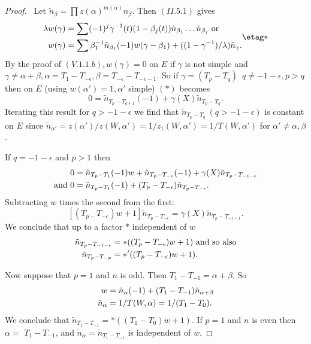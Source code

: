 \documentclass{memo-l}
\theoremstyle{definition}
\theoremstyle{remark}
\numberwithin{section}{chapter}
\numberwithin{equation}{chapter}
\begin{document}
\begin{proof} \ Let $\tilde n _{{\beta}}  = \prod
z({\alpha})^{m({\alpha})}n_{{\beta}}$.  Then $(II.5.1)$ gives
$$
\aligned
{\lambda}w({\gamma})  &=
\sum(-1)^{j}{\gamma}^{-1}(t)(1-{\beta}_{j}(t))\tilde n _{{\beta_1}}\ldots
\tilde n _{{\beta_j}}\ {\text{or}}\ \\
w({\gamma})  &= \sum{\beta}_{1}^{-1}\tilde n _{{\beta_1}}
(-1)w({\gamma}-{\beta}_{1}) + ((1-{\gamma}^{-1})/{\lambda})\tilde n_{{\gamma}} .
\endaligned  \etag *
$$
By the proof of $(V.1.1.b), w({\gamma})  =  0$ on $E$ if ${\gamma}$ is not
simple and ${\gamma} \ne  {\alpha}+{\beta}, {\alpha} = T_{1}-T_{-{\epsilon}},
{\beta} = T_{-{\epsilon}}-T_{-{\epsilon}-1}$.  So if ${\gamma}  =
(T_{p}-T_{q})$\ $q \ne  -1-{\epsilon}, p > q$ then on $E$ (using $w({\alpha}')  =
1, {\alpha}'$ simple) $(*)$ becomes
$$
0  =  \tilde n_{T_{p}-T_{q+1}}(-1) + {\gamma}(X)\tilde{n}_{T_{p}-T_{q}} .
$$
Iterating this result for $q > -1-{\epsilon}$ we find that
$\tilde{n}_{T_{p}-T_{q}}\  (q > - 1 - {\epsilon})$ is constant on $E$
since $\tilde{n}_{{\alpha}'}  =  z({\alpha}')/z(W,{\alpha}')  =
1/z_{1}(W,{\alpha}')  =
1/T(W,{\alpha}')$ for ${\alpha}' \ne  {\alpha},{\beta}$.

   If $q  =  -1-{\epsilon}$ and $p > 1$ then
$$
\aligned
0 & =  \tilde{n}_{T_{p}-T_{1}} (-1)w + \tilde{n}_{T_{p}-T_{-{\epsilon}}}(-1)
+ {\gamma}(X)\tilde{n}_{T_{p}-T_{-1-{\epsilon}}} \\
{\text{and}}\ 0  &=  \tilde{n}_{T_{p}-T_{1}}(-1) +
(T_{p}-T_{-{\epsilon}})\tilde{n}_{T_{p}-T_{-{\epsilon}}}.
\endaligned
$$
Subtracting $w$ times the second from the first:
$$
[(T_{p-}T_{-{\epsilon}})w+1]\tilde n_{T_{p}-T_{-{\epsilon}}} =
{\gamma}(X)\tilde n_{T_{p}-T_{-{\epsilon}-1}}.
$$
We conclude that up to a factor $*$ independent of $w$
$$
\aligned
\tilde n_{T_{p}-T_{-1-{\epsilon}}}  &=
*((T_{p}-T_{-{\epsilon}})w+1)\ {\text{and\ so\ also}} \\
\tilde n_{T_{p}-T_{-p}}  &=  *'((T_{p}-T_{-{\epsilon}})w+1).
\endaligned
$$

   Now suppose that $p = 1$ and $n$ is odd.  Then $T_{1}-T_{-1}  =
{\alpha}+{\beta}$.  So
$$
\aligned
w  &=  \tilde n _{{\alpha}}(-1) + (T_{1}-T_{-1})\tilde n _{{\alpha}+{\beta}} \\
\tilde n _{{\alpha}}  &=  1/T(W,{\alpha})  =  1/(T_{1}-T_{0}).
\endaligned
$$
We conclude that $\tilde n_{T_{1}-T_{-1}}  =  *((T_{1}-T_{0})w+1)$.
If $p = 1$ and $n$ is even then ${\alpha}  = $ $T_{1}-T_{-1}$, and
$\tilde n_{{\alpha}}  =  \tilde n_{T_{1}-T_{-1}}$ is independent of $w$.


\end{proof}
\end{document}
